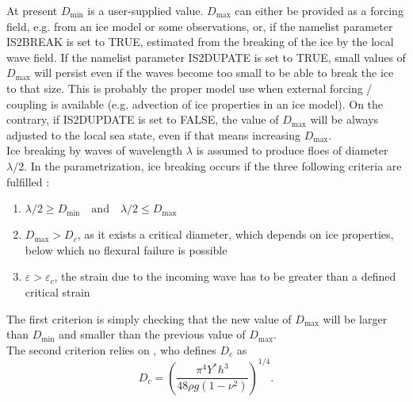 \noindent
At present $D_{\min}$ is a user-supplied value. $D_{\max}$ can either be 
provided as a forcing field, e.g. from an 
ice model or some observations, or, if the namelist parameter {\code IS2BREAK} is set to {\code TRUE}, 
estimated from 
the breaking of the ice by the local wave field. If the namelist parameter {\code IS2DUPATE}  is set to  
{\code TRUE}, small values of $D_{\max}$ will persist even if the waves become too small to be able to break the ice to 
that size. This is probably the proper model 
use when  external forcing / coupling is available (e.g. advection of ice properties in an ice model). 
 On the contrary, if {\code IS2DUPDATE} is set to  {\code FALSE}, the value of $D_{\max}$ will be always adjusted to the local sea state, 
even if that means increasing $D_{\max}$.\\

\noindent
Ice breaking by waves of wavelength $\lambda$ is assumed to produce floes of diameter $\lambda / 2$. 
In the parametrization, ice breaking occurs if the three following criteria are fulfilled \citep{art:Wea13}:
\begin{enumerate}
\item $\lambda/2 \geq D_{\min} \quad \mathrm{and} \quad  \lambda/2 \leq D_{\max}$
\item $D_{\max}>D_c$, as it exists a critical diameter, which depends on ice properties, below which no flexural failure is possible
\item $\varepsilon>\varepsilon_c$, the strain due to the incoming wave has to 
be greater than a defined critical strain
\end{enumerate}
The first criterion is simply checking that the new value of $D_{\max}$ will be larger than $D_{\min}$ and smaller 
than the previous value of $D_{\max}$.\\

\noindent
The second criterion relies on \cite{inc:M86}, who defines $D_{c}$ as
\begin{equation}
D_{c}=\left(\frac{\pi^4 Y^* h^3}{48 \rho g (1 -\nu ^2)}\right)^{1/4}. 
\end{equation}
 


